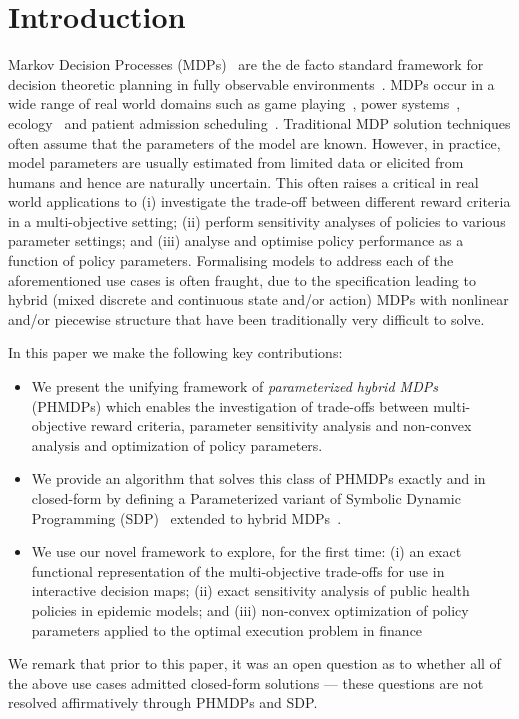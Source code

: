 \section{Introduction}
\label{sec:introduction}

Markov Decision Processes (MDPs)~\parencite{Howard_MIT_1960} are the
de facto standard framework for decision theoretic planning in fully
observable environments~\parencite{Boutilier_JAIR_1999}. MDPs occur in
a wide range of real world domains such as game
playing~\parencite{Szita_RL_2012}, power
systems~\parencite{Reddy_IJCAI_2011},
ecology~\parencite{Williams_EM_2009} and patient admission
scheduling~\parencite{Zhu_AIM_2014}. Traditional MDP solution
techniques often assume that the parameters of the model are
known. However, in practice, model parameters are usually estimated from limited data or
elicited from humans and hence are naturally uncertain.  This often raises a critical in real
world applications to (i) investigate the trade-off between
different reward criteria in a multi-objective setting; (ii) 
perform sensitivity analyses of policies to various parameter
settings; and (iii) analyse and optimise policy performance as a
function of policy parameters.  Formalising models to address each of
the aforementioned use cases is often fraught, due to the
specification leading to hybrid (mixed discrete and continuous
state and/or action) MDPs with nonlinear and/or piecewise structure
that have been traditionally very difficult to solve.

In this paper we make the following key contributions:
\begin{itemize}
    \item We present the unifying framework of {\it parameterized hybrid
      MDPs} (PHMDPs) which enables the investigation of trade-offs between
      multi-objective reward criteria, parameter sensitivity analysis and
      non-convex analysis and optimization of policy parameters.
    \item We provide an algorithm that solves this class of
      PHMDPs exactly and in closed-form by defining a Parameterized variant of 
      Symbolic Dynamic Programming (SDP)~\parencite{Boutilier_IJCAI_2001}
      extended to hybrid MDPs~\cite{sanner_uai11}.
    \item We use our novel framework to explore, for the first time:
      (i) an exact functional representation of the multi-objective
      trade-offs for use in interactive decision maps; (ii) exact
      sensitivity analysis of public health policies in epidemic
      models; and (iii) non-convex optimization of policy parameters
      applied to the optimal execution problem in finance
\end{itemize}
We remark that prior to this paper, it was an open question as to whether
all of the above use cases admitted closed-form solutions --- these questions
are not resolved affirmatively through PHMDPs and SDP.

